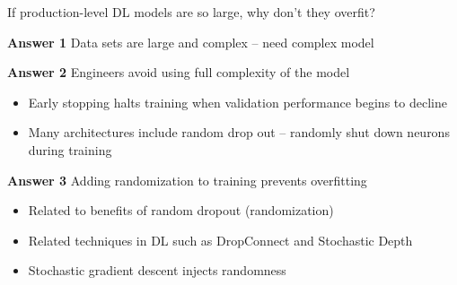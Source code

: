\begin{frame}
    
    If production-level DL models are so large, why don't they overfit?

        \vspace{0.5em}
        \vspace{0.5em}
        \vspace{0.5em}

    \textbf{Answer 1} Data sets are large and complex -- need complex model

        \vspace{0.5em}
        \vspace{0.5em}
    \textbf{Answer 2} Engineers avoid using full complexity of the model

    \begin{itemize}
        \item Early stopping halts training when validation performance begins to decline
        \vspace{0.5em}
        \item Many architectures include random drop out -- randomly shut down neurons
            during training
    \end{itemize}


\end{frame}

\begin{frame}
    
    \textbf{Answer 3} Adding randomization to training prevents overfitting

    \begin{itemize}
        \item Related to benefits of random dropout (randomization)
        \vspace{0.5em}
        \item Related techniques in DL such as DropConnect and Stochastic Depth
        \vspace{0.5em}
        \item Stochastic gradient descent injects randomness
    \end{itemize}

\end{frame}

